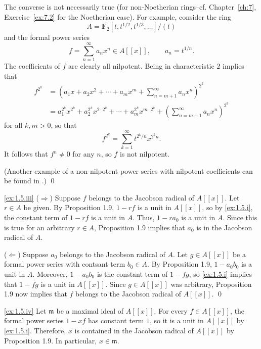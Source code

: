 The converse is not necessarily true (for non-Noetherian rings--cf. Chapter~\ref{ch:7}, Exercise~\ref{ex:7.2} for the Noetherian case).
For example, consider the ring
\begin{equation*}
A = \mathbf F_2[t,t^{1/2},t^{1/3},\ldots]/(t)
\end{equation*}
and the formal power series
\begin{equation*}
f = \sum_{n=1}^\infty a_n x^n \in A[[x]],
\qquad
a_n = t^{1/n}.
\end{equation*}
The coefficients of $f$ are clearly all nilpotent.
Being in characteristic $2$ implies that
\begin{align*}
f^{2^k}
&= \left(a_1 x + a_2 x^2 + \cdots + a_m x^m + \sum_{n = m+1}^\infty a_n x^n\right)^{2^k}
\\&= a_1^{2^k} x^{2^k} + a_2^{2^k} x^{2\cdot2^k} + \cdots + a_m^{2^k} x^{m \cdot 2^k} + \left(\sum_{n = m+1}^\infty a_n x^n\right)^{2^k}
\end{align*}
for all $k,m>0$, so that
\begin{equation*}
f^{2^k}
= \sum_{k=1}^\infty t^{2^k/n} x^{2^k n}.
\end{equation*}
It follows that $f^n \neq 0$ for any $n$, so $f$ is not nilpotent.

(Another example of a non-nilpotent power series with nilpotent coefficients can be found in \cite[Example 2]{FieldsZeroDivisors}.)
\qed


\noindent
\ref{ex:1.5.iii}
($\Rightarrow$)
Suppose $f$ belongs to the Jacobson radical of $A[[x]]$.
Let $r \in A$ be given.
By Proposition 1.9, $1 - r f$ is a unit in $A[[x]]$, so by \ref{ex:1.5.i}, the constant term of $1 - r f$ is a unit in $A$.
Thus, $1 - r a_0$ is a unit in $A$.
Since this is true for an arbitrary $r \in A$, Proposition 1.9 implies that $a_0$ is in the Jacobson radical of $A$.

($\Leftarrow$)
Suppose $a_0$ belongs to the Jacobson radical of $A$.
Let $g \in A[[x]]$ be a formal power series with contsant term $b_0 \in A$.
By Proposition 1.9, $1 - a_0 b_0$ is a unit in $A$.
Moreover, $1 - a_0 b_0$ is the constant term of $1 - f g$, so \ref{ex:1.5.i} implies that $1 - f g$ is a unit in $A[[x]]$.
Since $g\in A[[x]]$ was arbitrary, Proposition 1.9 now implies that $f$ belongs to the Jacobson radical of $A[[x]]$.
\qed

\noindent
\ref{ex:1.5.iv}
Let $\mathfrak m$ be a maximal ideal of $A[[x]]$.
For every $f\in A[[x]]$, the formal power series $1 - x f$ has constant term $1$, so it is a unit in $A[[x]]$ by \ref{ex:1.5.i}.
Therefore, $x$ is contained in the Jacobson radical of $A[[x]]$ by Proposition 1.9.
In particular, $x \in \mathfrak m$.

